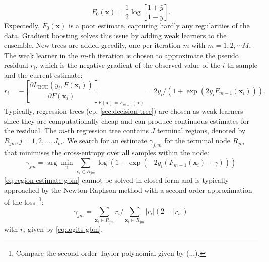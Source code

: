 \begin{equation}
    F_0(\mathbf{x})= \frac{1}{2} \log \left[\frac{1+\bar{y}}{1-\bar{y}}\right].
\end{equation}
Expectedly, $F_0(\mathbf{x})$ is a poor estimate, capturing hardly any regularities of the data. Gradient boosting solves this issue by adding weak learners to the ensemble. New trees are added greedily, one per iteration $m$ with $m=1,2,\cdots M$. The weak learner in the $m$-th iteration is chosen to approximate the pseudo residual $r_i$, which is the negative gradient of the observed value of the $i$-th sample and the current estimate:
\begin{equation}
    r_i=-\left[\frac{\partial L_{\mathrm{BCE}}\left(y_i, F\left(\mathbf{x}_i\right)\right)}{\partial F\left(\mathbf{x}_i\right)}\right]_{F(\mathbf{x})=F_{m-1}(\mathbf{x})}=2 y_i /\left(1+\exp \left(2 y_i F_{m-1}\left(\mathbf{x}_i\right)\right)\right).
\end{equation}
Typically, regression trees (cp. \cref{sec:decision-tree}) are chosen as weak learners since they are computationally cheap and can produce continuous estimates for the residual. The $m$-th regression tree contains $J$ terminal regions, denoted by $R_{j m}, j=1,2, \ldots, J_{m}$. We search for an estimate $\gamma_{j,m}$ for the terminal node $R_{jm}$ that minimises the cross-entropy over all samples within the node:
\begin{equation}
    \gamma_{j m}=\arg \min _\gamma \sum_{\mathbf{x}_i \in R_{j m}} \log \left(1+\exp \left(-2 y_i\left(F_{m-1}\left(\mathbf{x}_i\right)+\gamma\right)\right)\right)
    \label{eq:region-estimate-gbm}
\end{equation}
\cref{eq:region-estimate-gbm} cannot be solved in closed form and is typically approached by the Newton-Raphson method with a second-order approximation of the loss~\footnote{Compare the second-order Taylor polynomial given by (...).}:
\begin{equation}
    \gamma_{j m}=\sum_{\mathbf{x}_i \in R_{j m}} r_i / \sum_{\mathbf{x}_i \in R_{j m}}\left|r_i\right|\left(2-\left|r_i\right|\right)
\end{equation}
with $r_i$ given by \cref{eq:logits-gbm}.

